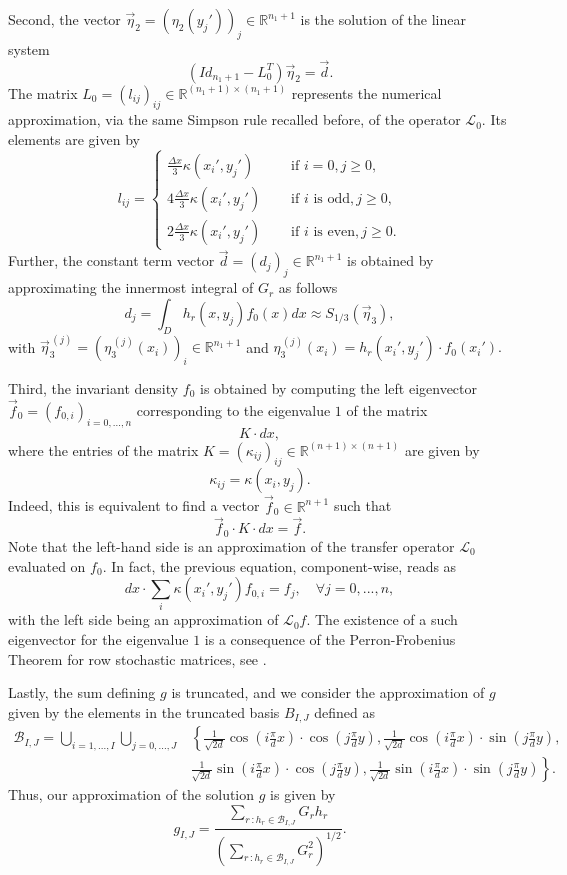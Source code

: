 \documentclass{amsart}
\begin{document}
Second, the vector $\Vec{\eta}_2 = (\eta_2(y_j'))_j \in \mathbb{R}^{n_1 +1}$ is the solution of the linear system
$$
\left(Id_{n_1 +1} - L_0^T \right) \Vec{\eta}_2 = \Vec{d}.
$$
The matrix $L_0 = (l_{ij})_{ij} \in \mathbb{R}^{(n_1+1)\times (n_1+1)}$ represents the numerical approximation, via the same Simpson rule recalled before, of the operator $\mathcal{L}_0$. Its elements are given by
$$
l_{ij} = \begin{cases}
    \frac{\Delta x}{3} \kappa (x_i', y_j') \quad &\text{ if }i=0, j \geq 0, \\
    4\frac{\Delta x}{3} \kappa (x_i', y_j') \quad &\text{ if }i \text{ is odd}, j \geq 0, \\
    2\frac{\Delta x}{3} \kappa (x_i', y_j') \quad &\text{ if }i \text{ is even}, j \geq 0.
\end{cases}
$$
Further, the constant term vector $\Vec{d} =(d_j)_j \in \mathbb{R}^{n_1 +1}$ is obtained by approximating the innermost integral of $G_r$ as follows
$$
d_j = \int_D h_r(x, y_j) f_0(x) dx \approx  S_{1/3}(\Vec{\eta}_3),
$$
with $\Vec{\eta}_3^{\,(j)} = (\eta_3^{\,(j)}(x_i))_i \in \mathbb{R}^{n_1 +1}$ and $\eta_3^{\,(j)}(x_i) = h_r(x_i', y_j') \cdot f_0(x_i').$

Third, the invariant density $f_0$ is obtained by computing the left eigenvector $\Vec{f}_0 = (f_{0,i})_{i = 0,...,n}$ corresponding to the eigenvalue $1$ of the matrix
$$
K \cdot dx,
$$
where the entries of the matrix $K = (\kappa_{ij})_{ij} \in \mathbb{R}^{(n+1) \times (n+1)}$ are given by
$$
\kappa_{ij} = \kappa(x_i, y_j).
$$
Indeed, this is equivalent to find a vector $\Vec{f}_0 \in \mathbb{R}^{n+1}$ such that
$$
\Vec{f}_0 \cdot K \cdot dx = \Vec{f}.
$$
Note that the left-hand side is an approximation of the transfer operator $\mathcal{L}_0$ evaluated on $f_0$. In fact, the previous equation, component-wise, reads as
$$
dx \cdot \sum_{i} \kappa(x_i', y_j') f_{0,i} = f_j, \quad \forall j = 0,..., n, $$ with the left side being an approximation of $\mathcal{L}_0f$. The existence of a such eigenvector for the eigenvalue $1$ is a consequence of the Perron-Frobenius Theorem for row stochastic matrices, see \cite{Bini2005}.

Lastly, the sum defining $g$ is truncated, and we consider the approximation of $g$ given by the elements in the truncated basis $B_{I,J}$ defined as 
\begin{equation*}
    \begin{split}
        \mathcal{B}_{I,J} = \bigcup_{i= 1,...,I} \bigcup_{j=0,...,J} & \left \lbrace 
\frac{1}{\sqrt{2d}} \cos( i \frac{\pi }{d}x) \cdot \cos (j \frac{\pi}{d}y), \frac{1}{\sqrt{2d}} \cos( i \frac{\pi }{d}x) \cdot \sin (j \frac{\pi}{d}y), \right. \\
& \left. \frac{1}{\sqrt{2d}} \sin( i \frac{\pi }{d}x) \cdot \cos (j \frac{\pi}{d}y), \frac{1}{\sqrt{2d}} \sin( i \frac{\pi }{d}x) \cdot \sin (j \frac{\pi}{d}y)
\right \rbrace .
\end{split}
\end{equation*}
Thus, our approximation of the solution $g$ is given by
$$
g_{I,J} = \frac{\sum_{r \, : h_r \in \mathcal{B}_{I,J}} G_r h_r}{\left(\sum_{r \, : h_r \in \mathcal{B}_{I,J}} G_r^2 \right)^{1/2}}   .
$$
\end{document}
